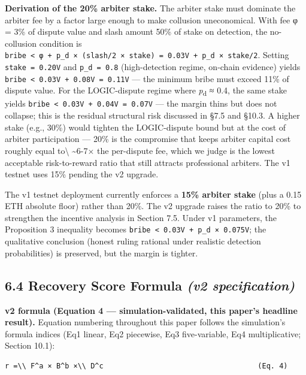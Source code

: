 \documentclass[
  10pt,
]{article}
\begin{document}
\textbf{Derivation of the 20\% arbiter stake.} The arbiter stake must
dominate the arbiter fee by a factor large enough to make collusion
uneconomical. With fee φ = 3\% of dispute value and slash amount 50\% of
stake on detection, the no-collusion condition is
\texttt{bribe\ \textless{}\ φ\ +\ p\_d\ ×\ (slash/2\ ×\ stake)\ =\ 0.03V\ +\ p\_d\ ×\ stake/2}.
Setting \texttt{stake\ =\ 0.20V} and \texttt{p\_d\ =\ 0.8}
(high-detection regime, on-chain evidence) yields
\texttt{bribe\ \textless{}\ 0.03V\ +\ 0.08V\ =\ 0.11V} --- the minimum
bribe must exceed 11\% of dispute value. For the LOGIC-dispute regime
where \emph{p}\textsubscript{d} ≈ 0.4, the same stake yields
\texttt{bribe\ \textless{}\ 0.03V\ +\ 0.04V\ =\ 0.07V} --- the margin
thins but does not collapse; this is the residual structural risk
discussed in §7.5 and §10.3. A higher stake (e.g., 30\%) would tighten
the LOGIC-dispute bound but at the cost of arbiter participation ---
20\% is the compromise that keeps arbiter capital cost roughly equal
to\textbackslash{} \textasciitilde6-7× the per-dispute fee, which we
judge is the lowest acceptable risk-to-reward ratio that still attracts
professional arbiters. The v1 testnet uses 15\% pending the v2 upgrade.

The v1 testnet deployment currently enforces a \textbf{15\% arbiter
stake} (plus a 0.15 ETH absolute floor) rather than 20\%. The v2 upgrade
raises the ratio to 20\% to strengthen the incentive analysis in Section
7.5. Under v1 parameters, the Proposition 3 inequality becomes
\texttt{bribe\ \textless{}\ 0.03V\ +\ p\_d\ ×\ 0.075V}; the qualitative
conclusion (honest ruling rational under realistic detection
probabilities) is preserved, but the margin is tighter.

\hypertarget{recovery-score-formula-v2-specification}{%
\subsection{\texorpdfstring{6.4 Recovery Score Formula \emph{(v2
specification)}}{6.4 Recovery Score Formula (v2 specification)}}\label{recovery-score-formula-v2-specification}}

\textbf{v2 formula (Equation 4 --- simulation-validated, this paper's
headline result).} Equation numbering throughout this paper follows the
simulation's formula indices (Eq1 linear, Eq2 piecewise, Eq3
five-variable, Eq4 multiplicative; Section 10.1):

\begin{verbatim}
r =\\ F^a × B^b ×\\ D^c                                    (Eq. 4)
\end{verbatim}
\end{document}
